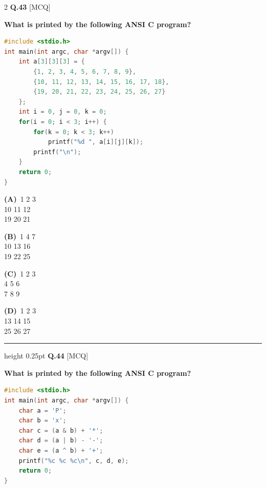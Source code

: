 \documentclass[a4paper,10pt,twoside]{article}
\begin{document}
\begin{multicols}{2}
\noindent\textbf{Q.43} \hfill {\footnotesize\textsf{[MCQ]}}
\par\vspace{2pt}
{\bfseries What is printed by the following ANSI C program?
\begin{lstlisting}[language=C]
#include <stdio.h>
int main(int argc, char *argv[]) {
    int a[3][3][3] = {
        {1, 2, 3, 4, 5, 6, 7, 8, 9},
        {10, 11, 12, 13, 14, 15, 16, 17, 18},
        {19, 20, 21, 22, 23, 24, 25, 26, 27}
    };
    int i = 0, j = 0, k = 0;
    for(i = 0; i < 3; i++) {
        for(k = 0; k < 3; k++)
            printf("%d ", a[i][j][k]);
        printf("\n");
    }
    return 0;
}
\end{lstlisting} \par}
\par\vspace{2pt}\noindent
\textbf{(A)}~1 2 3 \\ 10 11 12 \\ 19 20 21\par\vspace{2pt}\noindent
\textbf{(B)}~1 4 7 \\ 10 13 16 \\ 19 22 25\par\vspace{2pt}\noindent
\textbf{(C)}~1 2 3 \\ 4 5 6 \\ 7 8 9\par\vspace{2pt}\noindent
\textbf{(D)}~1 2 3 \\ 13 14 15 \\ 25 26 27
\par\vspace{6pt}\hrule height 0.25pt\vspace{6pt}
\noindent\textbf{Q.44} \hfill {\footnotesize\textsf{[MCQ]}}
\par\vspace{2pt}
{\bfseries What is printed by the following ANSI C program?
\begin{lstlisting}[language=C]
#include <stdio.h>
int main(int argc, char *argv[]) {
    char a = 'P';
    char b = 'x';
    char c = (a & b) + '*';
    char d = (a | b) - '-';
    char e = (a ^ b) + '+';
    printf("%c %c %c\n", c, d, e);
    return 0;
}
\end{lstlisting} \par}
\par\vspace{2pt}\noindent
\begin{tabular*}{\columnwidth}{@{\extracolsep{\fill}}p{}p{}@{}}

\end{tabular*}
\end{multicols}
\end{document}
